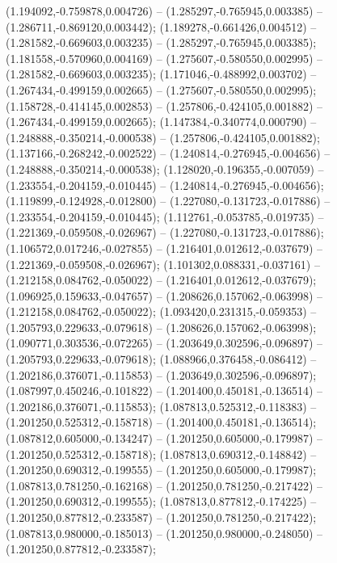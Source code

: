  (1.194092,-0.759878,0.004726) -- (1.285297,-0.765945,0.003385) -- (1.286711,-0.869120,0.003442);
 (1.189278,-0.661426,0.004512) -- (1.281582,-0.669603,0.003235) -- (1.285297,-0.765945,0.003385);
 (1.181558,-0.570960,0.004169) -- (1.275607,-0.580550,0.002995) -- (1.281582,-0.669603,0.003235);
 (1.171046,-0.488992,0.003702) -- (1.267434,-0.499159,0.002665) -- (1.275607,-0.580550,0.002995);
 (1.158728,-0.414145,0.002853) -- (1.257806,-0.424105,0.001882) -- (1.267434,-0.499159,0.002665);
 (1.147384,-0.340774,0.000790) -- (1.248888,-0.350214,-0.000538) -- (1.257806,-0.424105,0.001882);
 (1.137166,-0.268242,-0.002522) -- (1.240814,-0.276945,-0.004656) -- (1.248888,-0.350214,-0.000538);
 (1.128020,-0.196355,-0.007059) -- (1.233554,-0.204159,-0.010445) -- (1.240814,-0.276945,-0.004656);
 (1.119899,-0.124928,-0.012800) -- (1.227080,-0.131723,-0.017886) -- (1.233554,-0.204159,-0.010445);
 (1.112761,-0.053785,-0.019735) -- (1.221369,-0.059508,-0.026967) -- (1.227080,-0.131723,-0.017886);
 (1.106572,0.017246,-0.027855) -- (1.216401,0.012612,-0.037679) -- (1.221369,-0.059508,-0.026967);
 (1.101302,0.088331,-0.037161) -- (1.212158,0.084762,-0.050022) -- (1.216401,0.012612,-0.037679);
 (1.096925,0.159633,-0.047657) -- (1.208626,0.157062,-0.063998) -- (1.212158,0.084762,-0.050022);
 (1.093420,0.231315,-0.059353) -- (1.205793,0.229633,-0.079618) -- (1.208626,0.157062,-0.063998);
 (1.090771,0.303536,-0.072265) -- (1.203649,0.302596,-0.096897) -- (1.205793,0.229633,-0.079618);
 (1.088966,0.376458,-0.086412) -- (1.202186,0.376071,-0.115853) -- (1.203649,0.302596,-0.096897);
 (1.087997,0.450246,-0.101822) -- (1.201400,0.450181,-0.136514) -- (1.202186,0.376071,-0.115853);
 (1.087813,0.525312,-0.118383) -- (1.201250,0.525312,-0.158718) -- (1.201400,0.450181,-0.136514);
 (1.087812,0.605000,-0.134247) -- (1.201250,0.605000,-0.179987) -- (1.201250,0.525312,-0.158718);
 (1.087813,0.690312,-0.148842) -- (1.201250,0.690312,-0.199555) -- (1.201250,0.605000,-0.179987);
 (1.087813,0.781250,-0.162168) -- (1.201250,0.781250,-0.217422) -- (1.201250,0.690312,-0.199555);
 (1.087813,0.877812,-0.174225) -- (1.201250,0.877812,-0.233587) -- (1.201250,0.781250,-0.217422);
 (1.087813,0.980000,-0.185013) -- (1.201250,0.980000,-0.248050) -- (1.201250,0.877812,-0.233587);

